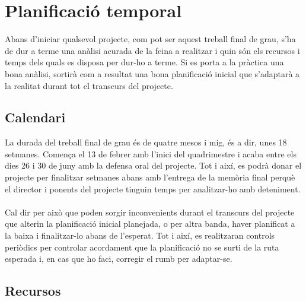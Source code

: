 
\chapter{Planificació temporal} %

\label{Chapter9} %

Abans d'iniciar qualsevol projecte, com pot ser aquest treball final de grau, s'ha de dur a terme una anàlisi acurada de la feina a realitzar i quin són els recursos i temps dels quals es disposa per dur-ho a terme. Si es porta a la pràctica una bona anàlisi, sortirà com a resultat una bona planificació inicial que s'adaptarà a la realitat durant tot el transcurs del projecte.


\section{Calendari}

La durada del treball final de grau és de quatre mesos i mig, és a dir, unes 18 setmanes. Comença el 13 de febrer amb l'inici del quadrimestre i acaba entre els dies 26 i 30 de juny amb la defensa oral del projecte. Tot i així, es podrà donar el projecte per finalitzar setmanes abans amb l'entrega de la memòria final perquè el director i ponents del projecte tinguin temps per analitzar-ho amb deteniment.
\\\\
Cal dir per això que poden sorgir inconvenients durant el transcurs del projecte que alterin la planificació inicial planejada, o per altra banda, haver planificat a la baixa i finalitzar-lo abans de l'esperat. Tot i així, es realitzaran controls periòdics per controlar acordament que la planificació no se surti de la ruta esperada i, en cas que ho faci, corregir el rumb per adaptar-se.


\section{Recursos}

